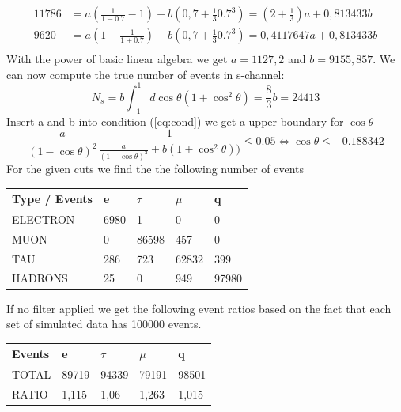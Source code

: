 \documentclass[]{article}
\begin{document}
\begin{equation}
\begin{split}
11786 &= a(\frac{1}{1-0.7}-1)+b(0,7+\frac{1}{3}0.7^3) =  (2+\frac{1}{3})a+0,813433b\\
9620 &= a(1-\frac{1}{1+0.7})+b(0,7+\frac{1}{3}0.7^3) = 0,4117647a+ 0,813433b\\
\end{split}
\end{equation}
With the power of basic linear algebra we get $a=1127,2$ and $b=9155,857$.
We can now compute the true number of events in s-channel:
\begin{equation}
N_s = b\int_{-1}^1 d\cos\theta (1+\cos^2\theta) = \frac{8}{3}b = 24413
\end{equation}
Insert a and b into condition (\ref{eq:cond}) we get a upper boundary for $\cos\theta$
\begin{equation}
\frac{a}{(1-\cos\theta)^2}\frac{1}{\frac{a}{(1-\cos\theta)^2}+b(1+\cos^2\theta))} \leq 0.05 \iff \cos\theta \leq -0.188342
\end{equation}
For the given cuts we find the the following number of events
\newline
\newline
\begin{tabular}{ |p{3cm}||p{2cm}|p{2cm}|p{2cm}|p{2cm}|  }
 \hline
 Type / Events & e & $\tau$ & $\mu$ & q \\
 \hline
  ELECTRON & 6980 & 1 & 0 & 0 \\
  MUON & 0 & 86598 & 457 & 0 \\
  TAU & 286 & 723 & 62832 & 399 \\
  HADRONS & 25 & 0 & 949 & 97980 \\
 \hline
\end{tabular}
\newline
\newline
If no filter applied we get the following event ratios based on the fact that each set of simulated data has 100000 events. 
\newline
\newline
\begin{tabular}{ |p{3cm}||p{2cm}|p{2cm}|p{2cm}|p{2cm}|  }
 \hline
 Events & e & $\tau$ & $\mu$ & q \\
 \hline
 \hline
  TOTAL & 89719 & 94339 & 79191 & 98501 \\
  \hline
  RATIO & 1,115 & 1,06 & 1,263 & 1,015 \\
 \hline
\end{tabular}
\newline
\end{document}
